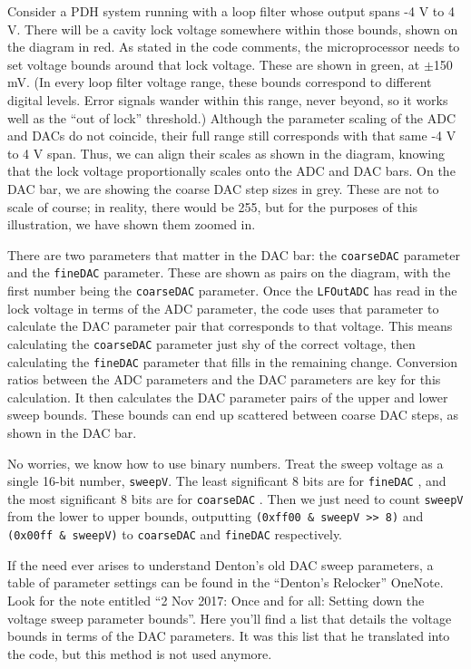 \documentclass[10pt]{report}
\newcommand{\LFOutADC}[0] {\texttt{LFOutADC}}
\newcommand{\coarseDAC}[0] {\texttt{coarseDAC}}
\newcommand{\fineDAC}[0] {\texttt{fineDAC}}
\begin{document}
Consider a PDH system running with a loop filter whose output spans -4 V to 4 V. There will be a cavity lock voltage somewhere within those bounds, shown on the diagram in red. As stated in the code comments, the microprocessor needs to set voltage bounds around that lock voltage. These are shown in green, at $\pm$150 mV. (In every loop filter voltage range, these bounds correspond to different digital levels. Error signals wander within this range, never beyond, so it works well as the ``out of lock'' threshold.) Although the parameter scaling of the ADC and DACs do not coincide, their full range still corresponds with that same -4 V to 4 V span. Thus, we can align their scales as shown in the diagram, knowing that the lock voltage proportionally scales onto the ADC and DAC bars. On the DAC bar, we are showing the coarse DAC step sizes in grey. These are not to scale of course; in reality, there would be 255, but for the purposes of this illustration, we have shown them zoomed in.

There are two parameters that matter in the DAC bar: the \coarseDAC{}  parameter and the \fineDAC{}  parameter. These are shown as pairs on the diagram, with the first number being the \coarseDAC{}  parameter. Once the \LFOutADC{}  has read in the lock voltage in terms of the ADC parameter, the code uses that parameter to calculate the DAC parameter pair that corresponds to that voltage. This means calculating the \coarseDAC{}  parameter just shy of the correct voltage, then calculating the \fineDAC{}  parameter that fills in the remaining change. Conversion ratios between the ADC parameters and the DAC parameters are key for this calculation. It then calculates the DAC parameter pairs of the upper and lower sweep bounds. These bounds can end up scattered between coarse DAC steps, as shown in the DAC bar.

No worries, we know how to use binary numbers. Treat the sweep voltage as a single 16-bit number, \texttt{sweepV}. The least significant 8 bits are for \fineDAC{} , and the most significant 8 bits are for \coarseDAC{} . Then we just need to count \texttt{sweepV} from the lower to upper bounds, outputting \texttt{(0xff00 \& sweepV >> 8)} and \texttt{(0x00ff \& sweepV)} to \coarseDAC{}  and \fineDAC{}  respectively.



If the need ever arises to understand Denton's old DAC sweep parameters, a table of parameter settings can be found in the ``Denton's Relocker'' OneNote. Look for the note entitled ``2 Nov 2017: Once and for all: Setting down the voltage sweep parameter bounds''. Here you'll find a list that details the voltage bounds in terms of the DAC parameters. It was this list that he translated into the code, but this method is not used anymore.
\end{document}
